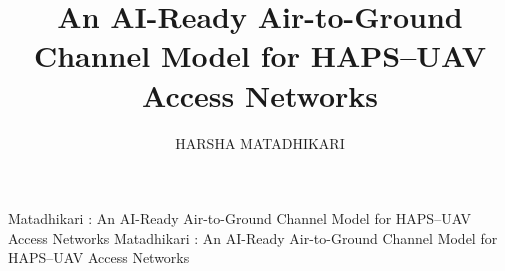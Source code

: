 \documentclass[]{ieeeaccess}
\begin{document}

\title{An AI-Ready Air-to-Ground Channel Model for HAPS--UAV Access Networks}

\author{\uppercase{Harsha Matadhikari}}

\address[1]{PG Diploma in Advanced Communication Engineering with Quantum AI Integration, Indian Institute of Technology Delhi, New Delhi, India (e-mail: harsha.matadhikari@gmail.com)}


\markboth
{Matadhikari \headeretal: An AI-Ready Air-to-Ground Channel Model for HAPS--UAV Access Networks}
{Matadhikari \headeretal: An AI-Ready Air-to-Ground Channel Model for HAPS--UAV Access Networks}

\end{document}
